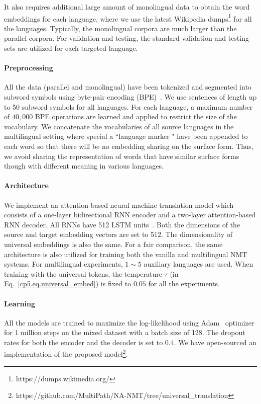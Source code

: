 It also requires additional large amount of monolingual data to obtain the word embeddings for each language, where we use the latest Wikipedia dumps\footnote{https://dumps.wikimedia.org/} for all the languages. Typically, the monolingual corpora are much larger than the parallel corpora. For validation and testing, the standard validation and testing sets are utilized for each targeted language.

\paragraph{Preprocessing}
All the data (parallel and monolingual) have been tokenized and segmented into subword symbols using byte-pair encoding (BPE)~\cite{sennrich2015neural}. We use sentences of length up to 50 subword symbols for all languages.  For each language, a maximum number of $40,000$ BPE operations are  learned and  applied to restrict the size of the vocabulary.  We concatenate the vocabularies of all source languages in the multilingual setting where special a ``language marker " have been appended to each word  so that there will be no embedding sharing on the surface form. Thus, we avoid sharing the representation  of words that have similar surface forms though with different meaning in various languages.

\paragraph{Architecture} We implement an attention-based neural machine translation model which consists of a one-layer bidirectional RNN encoder and a two-layer attention-based RNN decoder. All  RNNs have 512 LSTM units~\cite{hochreiter1997long}. Both the dimensions of the source and target embedding vectors are set to 512. The dimensionality of universal embeddings is also the same. For a fair comparison, the same architecture is also utilized for training both the vanilla and multilingual NMT systems. For multilingual experiments, $1\sim 5$ auxiliary languages are used.  When training with the universal tokens, the temperature $\tau$ (in Eq.~\eqref{cp5.eq.universal_embed}) is fixed to $0.05$ for all the experiments.

\paragraph{Learning}
All the models are trained to maximize the log-likelihood using Adam~\cite{kingma2014adam} optimizer for 1 million steps on the mixed dataset with a batch size of 128. The dropout rates for both the encoder and the decoder is set to 0.4. %
We have open-sourced an implementation of the proposed model\footnote{https://github.com/MultiPath/NA-NMT/tree/universal\_translation}.


